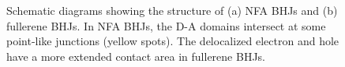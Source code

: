 \documentclass[12pt]{article}
\begin{document}
\begin{figure}[H]
\centering
{} \hspace{60 pt}
\caption{Schematic diagrams showing the structure of (a) 
NFA BHJs and (b) fullerene BHJs. In NFA BHJs, the D-A domains intersect at some point-like junctions (yellow spots). The delocalized electron and hole have a more extended contact area in fullerene BHJs.}
\label{fig:NFA and FA}
\end{figure}
\end{document}
